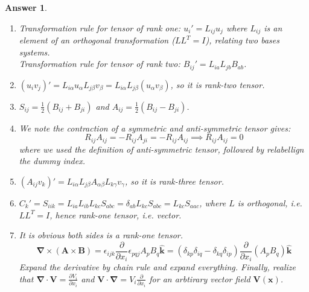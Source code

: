 \documentclass[a4paper]{article}
\newtheorem{ans}{Answer}[section]
\theoremstyle{new}
\begin{document}
\begin{ans}\leavevmode
\begin{enumerate}[label=(\roman*)]
\item Transformation rule for tensor of rank one: $u_i'=L_{ij}u_j$ where $L_{ij}$ is an element of an orthogonal transformation ($LL^T=I$), relating two bases systems.\\[5pt]
Transformation rule for tensor of rank two: $B_{ij}'=L_{ia}L_{jb}B_{ab}$.
\item $(u_iv_j)'=L_{i\alpha}u_\alpha L_{j\beta}v_\beta=L_{i\alpha}L_{j\beta}(u_\alpha v_\beta)$, so it is rank-two tensor.
\item $S_{ij}=\frac{1}{2}(B_{ij}+B_{ji})$ and $A_{ij}=\frac{1}{2}(B_{ij}-B_{ji})$.
\item We note the contraction of a symmetric and anti-symmetric tensor gives:
$$R_{ij}A_{ij}=-R_{ij}A_{ji}=-R_{ij}A_{ij}\implies R_{ij}A_{ij}=0$$
where we used the definition of anti-symmetric tensor, followed by relabellign the dummy index.
\item $(A_{ij}v_k)'=L_{i\alpha}L_{j\beta}A_{\alpha\beta}L_{k\gamma}v_\gamma$, so it is rank-three tensor.
\item $C_k'=S_{iik}=L_{ia}L_{ib}L_{kc}S_{abc}=\delta_{ab}L_{kc}S_{abc}=L_{kc}S_{aac}$, where $L$ is orthogonal, i.e. $LL^T=I$, hence rank-one tensor, i.e. vector.
\item It is obvious both sides is a rank-one tensor.
$$\boldsymbol{\nabla}\times(\mathbf{A}\times\mathbf{B})=\epsilon_{ijk}\frac{\partial}{\partial x_i}\epsilon_{pqj}A_pB_q\mathbf{\hat{k}}=(\delta_{kp}\delta_{iq}-\delta_{kq}\delta_{ip})\frac{\partial}{\partial x_i}(A_pB_q)\mathbf{\hat{k}}$$
Expand the derivative by chain rule and expand everything. Finally, realize that $\boldsymbol{\nabla}\cdot\mathbf{V}=\frac{\partial V_i}{\partial x_i}$ and $\mathbf{V}\cdot\boldsymbol{\nabla}=V_i\frac{\partial}{\partial x_i}$ for an arbtirary vector field $\mathbf{V}(\mathbf{x})$.
\end{enumerate}
\end{ans}
\newpage
\end{document}
